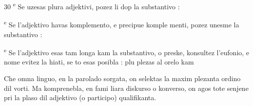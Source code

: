 \begin{VUpage}[34]{30}
\textsuperscript{e} Se uzesas plura adjektivi, pozez li dop la substantivo :\nl
{}

\textsuperscript{e} Se l'adjektivo havas komplemento, e precipue komple\cc
menti, pozez unesme la substantivo : \nl
{}

\textsuperscript{e} Se l'adjektivo esas tam longa kam la substantivo, o\nl
preske, konsultez l'eufonio, e nome evitez la hiati, se to\nl
esas posibla : \nl
{} plu plezas al orelo kam \nl
{}\nl
{}

\VUblanc{5.80pt}%
Che omna linguo, en la parolado sorgata, on selektas la\nl
maxim plezanta ordino dil vorti. Ma komprenebla, en fami\cc
liara diskurso o konverso, on agos tote senjene pri la plaso\nl
dil adjektivo (o participo) qualifikanta.
\end{VUpage}

